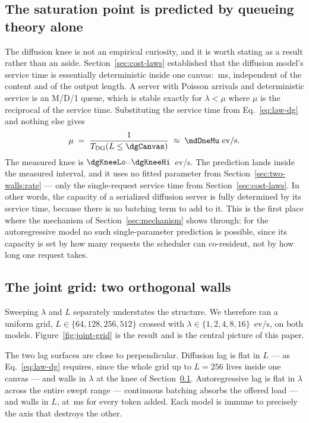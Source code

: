 \subsection{The saturation point is predicted by queueing theory alone}
\label{sec:two-walls:mdone}

The diffusion knee is not an empirical curiosity, and it is worth stating as a
result rather than an aside. Section~\ref{sec:cost-laws} established that the
diffusion model's service time is essentially deterministic inside one canvas:
\dgBase{}\,ms, independent of the content and of the output length. A server
with Poisson arrivals and deterministic service is an M/D/1 queue, which is
stable exactly for $\lambda < \mu$ where $\mu$ is the reciprocal of the service
time. Substituting the service time from Eq.~\eqref{eq:law-dg} and nothing else
gives
%
\begin{equation}
  \mu \;=\; \frac{1}{T_{\mathrm{DG}}(L \le \dgCanvas)} \;\approx\; \mdOneMu~\text{ev/s}.
  \label{eq:mdone}
\end{equation}
%
The measured knee is $\dgKneeLo$--$\dgKneeHi$~ev/s. The prediction lands inside
the measured interval, and it uses no fitted parameter from
Section~\ref{sec:two-walls:rate} --- only the single-request service time from
Section~\ref{sec:cost-laws}. In other words, the capacity of a serialized
diffusion server is fully determined by its service time, because there is no
batching term to add to it. This is the first place where the mechanism of
Section~\ref{sec:mechanism} shows through: for the autoregressive model no such
single-parameter prediction is possible, since its capacity is set by how many
requests the scheduler can co-resident, not by how long one request takes.

\subsection{The joint grid: two orthogonal walls}
\label{sec:two-walls:grid}

Sweeping $\lambda$ and $L$ separately understates the structure. We therefore
ran a uniform grid, $L \in \{64,128,256,512\}$ crossed with
$\lambda \in \{1,2,4,8,16\}$~ev/s, on both models. Figure~\ref{fig:joint-grid}
is the result and is the central picture of this paper.

The two lag surfaces are close to perpendicular. Diffusion lag is flat in $L$
--- as Eq.~\eqref{eq:law-dg} requires, since the whole grid up to $L=256$ lives
inside one canvas --- and walls in $\lambda$ at the knee of
Section~\ref{sec:two-walls:mdone}. Autoregressive lag is flat in $\lambda$
across the entire swept range --- continuous batching absorbs the offered load
--- and walls in $L$, at \arSlope{}\,ms for every token added. Each model is
immune to precisely the axis that destroys the other.

